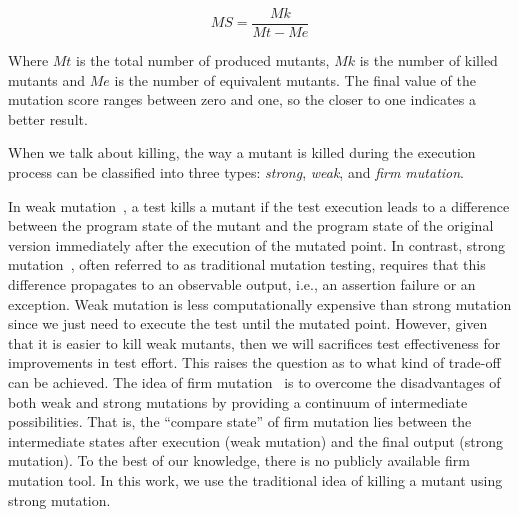 \[ MS=\frac{Mk}{Mt - Me} \]

Where $Mt$ is the total number of produced mutants, $Mk$ is the number of killed mutants and $Me$ is the number of equivalent mutants.
The final value of the mutation score ranges between zero and one, so the closer to one indicates a better result.

When we talk about killing, the way a mutant is killed during the execution process can be classified into three types: \textit{strong}, \textit{weak}, and \textit{firm mutation}. 

In weak mutation~\cite{HOWDEN:1982}, a test kills a mutant if the test execution leads to a difference between the program state of the mutant and the program state of the original version immediately after the execution of the mutated point. 
In contrast, strong mutation~\cite{DEMILLO:1978:1}, often referred to as traditional mutation testing, requires that this difference propagates to an observable output, i.e., an assertion failure or an exception.
Weak mutation is less computationally expensive than strong mutation since we just need to execute the test until the mutated point.
However, given that it is easier to kill weak mutants, then we will sacrifices test effectiveness for improvements in test effort.
This raises the question as to what kind of trade-off can be achieved.
The idea of firm mutation~\cite{WOODWARD:1988:1} is to overcome the disadvantages of both weak and strong mutations by providing a continuum of intermediate possibilities. 
That is, the ``compare state'' of firm mutation lies between the intermediate states after execution (weak mutation) and the final output (strong mutation).
To the best of our knowledge, there is no publicly available firm mutation tool.
In this work, we use the traditional idea of killing a mutant using strong mutation.

